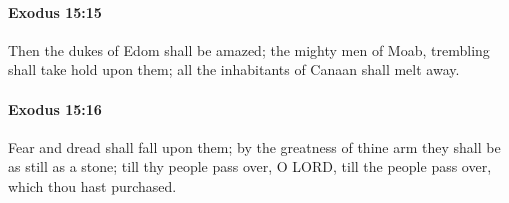 		\paragraph{Exodus 15:15} %
			\label{EXODUS-15-15}

			Then the dukes of Edom shall be amazed; the mighty men of Moab, trembling shall take hold upon them; all the inhabitants of Canaan shall melt away.


		\paragraph{Exodus 15:16} %
			\label{EXODUS-15-16}

			Fear and dread shall fall upon them; by the greatness of thine arm they shall be as still as a stone; till thy people pass over, O LORD, till the people pass over, which thou hast purchased.


